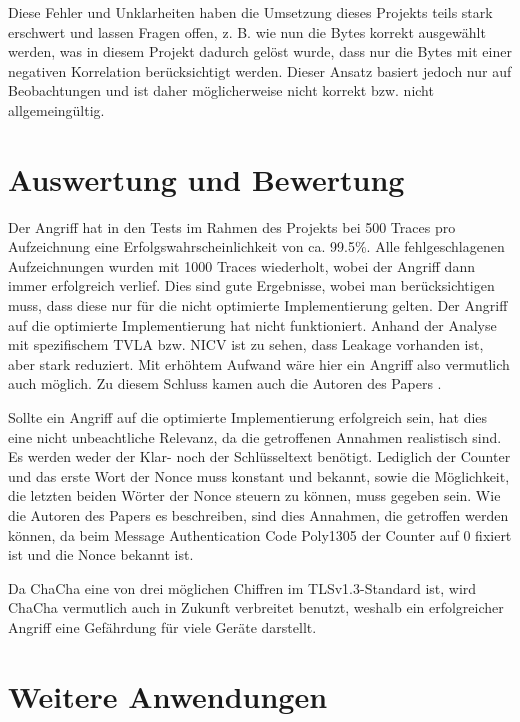 \documentclass[a4paper,ngerman]{scrreprt}
\begin{document}
Diese Fehler und Unklarheiten haben die Umsetzung dieses Projekts teils stark
erschwert und lassen Fragen offen, z. B. wie nun die Bytes korrekt ausgewählt
werden, was in diesem Projekt dadurch gelöst wurde, dass nur die Bytes mit einer
negativen Korrelation berücksichtigt werden. Dieser Ansatz basiert jedoch nur
auf Beobachtungen und ist daher möglicherweise nicht korrekt bzw. nicht
allgemeingültig.




\chapter{Auswertung und Bewertung}

Der Angriff hat in den Tests im Rahmen des Projekts bei 500 Traces pro
Aufzeichnung eine Erfolgswahrscheinlichkeit von ca. 99.5\%. Alle
fehlgeschlagenen Aufzeichnungen wurden mit 1000 Traces wiederholt, wobei der
Angriff dann immer erfolgreich verlief. Dies sind gute Ergebnisse, wobei man
berücksichtigen muss, dass diese nur für die nicht optimierte Implementierung
gelten. Der Angriff auf die optimierte Implementierung hat nicht funktioniert.
Anhand der Analyse mit spezifischem TVLA bzw. NICV ist zu sehen, dass Leakage
vorhanden ist, aber stark reduziert. Mit erhöhtem Aufwand wäre hier ein Angriff
also vermutlich auch möglich. Zu diesem Schluss kamen auch die Autoren des
Papers \cite{jungk_bhasin_2017}.

Sollte ein Angriff auf die optimierte Implementierung erfolgreich sein, hat dies
eine nicht unbeachtliche Relevanz, da die getroffenen Annahmen realistisch sind.
Es werden weder der Klar- noch der Schlüsseltext benötigt. Lediglich der Counter
und das erste Wort der Nonce muss konstant und bekannt, sowie die Möglichkeit,
die letzten beiden Wörter der Nonce steuern zu können, muss gegeben sein. Wie
die Autoren des Papers \cite{jungk_bhasin_2017} es beschreiben, sind dies
Annahmen, die getroffen werden können, da beim Message Authentication Code
Poly1305 der Counter auf 0 fixiert ist und die Nonce bekannt ist.

Da ChaCha eine von drei möglichen Chiffren im TLSv1.3-Standard ist, wird ChaCha
vermutlich auch in Zukunft verbreitet benutzt, weshalb ein erfolgreicher Angriff
eine Gefährdung für viele Geräte darstellt.




\chapter{Weitere Anwendungen}
\end{document}
